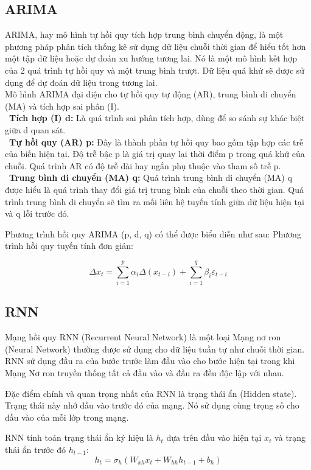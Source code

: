 \documentclass[conference]{IEEEtran}
\begin{document}
\subsection{ARIMA}
ARIMA, hay mô hình tự hồi quy tích hợp trung bình chuyển động, là một phương pháp phân tích thống kê sử dụng dữ liệu chuỗi thời gian để hiểu tốt hơn một tập dữ liệu hoặc dự đoán xu hướng tương lai. Nó là một mô hình kết hợp của 2 quá trình tự hồi quy và một trung bình trượt. Dữ liệu quá khứ sẽ được sử dụng để dự đoán dữ liệu trong tương lai.\\
Mô hình ARIMA đại diện cho tự hồi quy tự động (AR), trung bình di chuyển (MA) và tích hợp sai phân (I). \\
\indent\textbullet\ \textbf{Tích hợp (I) d:} Là quá trình sai phân tích hợp, dùng để so sánh sự khác biệt giữa d quan sát.\\
\indent\textbullet\ \textbf{Tự hồi quy (AR) p:} Đây là thành phần tự hồi quy bao gồm tập hợp các trễ của biến hiện tại. Độ trễ bậc p là giá trị quay lại thời điểm p trong quá khứ của chuỗi. Quá trình AR có độ trễ dài hay ngắn phụ thuộc vào tham số trễ p.\\
\indent\textbullet\ \textbf{Trung bình di chuyển (MA) q:} Quá trình trung bình di chuyển (MA) q được hiểu là quá trình thay đổi giá trị trung bình của chuỗi theo thời gian. Quá trình trung bình di chuyển sẽ tìm ra mối liên hệ tuyến tính giữa dữ liệu hiện tại và q lỗi trước đó.

Phương trình hồi quy ARIMA (p, d, q) có thể được biểu diễn như sau:
Phương trình hồi quy tuyến tính đơn giản:
\begin{samepage}
\[\Delta x_t = \sum_{i=1}^{p} \alpha_i \Delta (x_{t-i}) +  \sum_{i=1}^{q} \beta_i \varepsilon_{t-i}\]
\end{samepage}

\subsection{RNN}
Mạng hồi quy RNN (Recurrent Neural Network) là một loại Mạng nơ ron (Neural Network) thường được sử dụng cho dữ liệu tuần tự như chuỗi thời gian. RNN sử dụng đầu ra của bước trước làm đầu vào cho bước hiện tại trong khi Mạng Nơ ron truyền thống tất cả đầu vào và đầu ra đều độc lập với nhau.

Đặc điểm chính và quan trọng nhất của RNN là trạng thái ẩn (Hidden state). Trạng thái này nhớ đầu vào trước đó của mạng. Nó sử dụng cùng trọng số cho đầu vào của mỗi lớp trong mạng.

RNN tính toán trạng thái ẩn ký hiệu là \(h_t\) dựa trên đầu vào hiện tại \(x_t\) và trạng thái ẩn trước đó \(h_{t-1}\):
\[
h_t = \sigma_h (W_{xh} x_t + W_{hh} h_{t-1} + b_h)
\]
\end{document}
